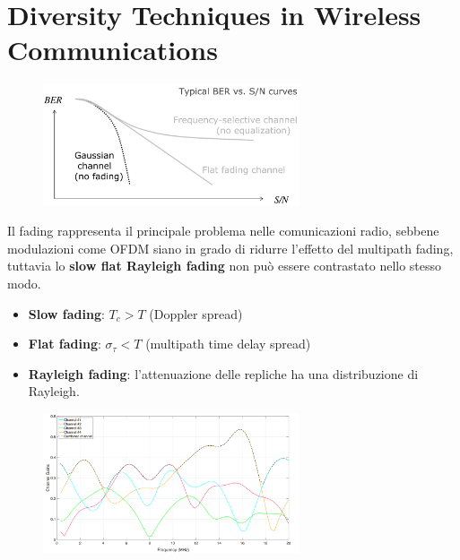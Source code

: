 \section*{Diversity Techniques in Wireless Communications}



\begin{figure}[ht]
    \centering
    \includegraphics[width=0.675\textwidth]{imgs/bers.png}
\end{figure}


Il fading rappresenta il principale problema nelle comunicazioni radio, sebbene modulazioni come OFDM siano in grado di ridurre l'effetto del multipath fading, tuttavia lo \textbf{slow flat Rayleigh fading} non può essere contrastato nello stesso modo.

\begin{itemize}
    \item \textbf{Slow fading}: $T_c > T$ (Doppler spread)
    \item \textbf{Flat fading}: $\sigma_{\tau}<T$  (multipath time delay spread)
    \item \textbf{Rayleigh fading}: l'attenuazione delle repliche ha una distribuzione di Rayleigh.
\end{itemize}

\begin{figure}[ht]
    \centering
    \includegraphics[width=0.675\textwidth]{imgs/diversity_graph.jpg}
\end{figure}

